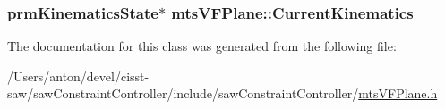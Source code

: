\subsubsection[{Current\+Kinematics}]{\setlength{\rightskip}{0pt plus 5cm}prm\+Kinematics\+State$\ast$ mts\+V\+F\+Plane\+::\+Current\+Kinematics}\label{classmts_v_f_plane_ac5a0d1eb84583858b41af1cf73c57626}


The documentation for this class was generated from the following file\+:\begin{DoxyCompactItemize}
\item 
/\+Users/anton/devel/cisst-\/saw/saw\+Constraint\+Controller/include/saw\+Constraint\+Controller/\hyperlink{mts_v_f_plane_8h}{mts\+V\+F\+Plane.\+h}\end{DoxyCompactItemize}
